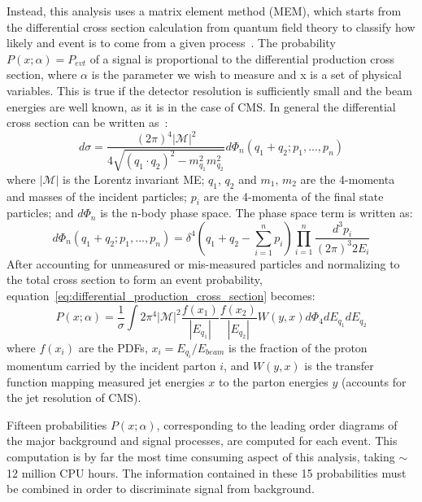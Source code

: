 Instead, this analysis uses a matrix element method (MEM), which starts from the differential cross section calculation from quantum field theory to classify how likely and event is to come from a given process~\cite{Canelli2003,Dong2008}.
The probability $P\left(x;\alpha\right)=P_{evt}$ of a signal is proportional to the differential production cross section, where $\alpha$ is the parameter we wish to measure and x is a set of physical variables.
This is true if the detector resolution is sufficiently small and the beam energies are well known, as it is in the case of CMS.
In general the differential cross section can be written as~\cite{Olive:2016xmw}:
\begin{equation}\label{eq:differential_production_cross_section}
d\sigma=\frac{\left(2\pi\right)^{4}|\mathcal{M}|^{2}}{4\sqrt{\left(q_{1}\cdot{q_{2}}\right)^{2}-m_{q_{1}}^{2}m_{q_{2}}^{2}}}d\Phi_{n}\left(q_{1}+q_{2};p_{1},...,p_{n}\right)
\end{equation}
where $|\mathcal{M}|$ is the Lorentz invariant ME; $q_{1}$, $q_{2}$ and $m_{1}$, $m_{2}$ are the 4-momenta and masses of the incident particles; $p_{i}$ are the 4-momenta of the final state particles; and $d\Phi_{n}$ is the n-body phase space.
The phase space term is written as:
\begin{equation}
d\Phi_{n}\left(q_{1}+q_{2};p_{1},...,p_{n}\right)=\delta^{4}\left(q_{1}+q_{2}-\sum_{i=1}^{n}p_{i}\right)\prod_{i=1}^{n}\frac{d^{3}p_{i}}{\left(2\pi\right)^{3}2E_{i}}
\end{equation}
After accounting for unmeasured or mis-measured particles and normalizing to the total cross section to form an event probability, equation~\ref{eq:differential_production_cross_section} becomes:
\begin{equation}
P(x;\alpha)=\frac{1}{\sigma}\int2\pi^{4}|\mathcal{M}|^{2}\frac{f\left(x_{1}\right)}{|E_{q_{1}}|}\frac{f\left(x_{2}\right)}{|E_{q_{2}}|}W\left(y,x\right)d\Phi_{4}dE_{q_{1}}dE_{q_{2}}
\end{equation}
where $f\left(x_{i}\right)$ are the PDFs, $x_{i}=E_{q_{i}}/E_{beam}$ is the fraction of the proton momentum carried by the incident parton $i$, and $W\left(y,x\right)$ is the transfer function mapping measured jet energies $x$ to the parton energies $y$ (accounts for the jet resolution of CMS).

Fifteen probabilities $P(x;\alpha)$, corresponding to the leading order diagrams of the major background and signal processes, are computed for each event. 
This computation is by far the most time consuming aspect of this analysis, taking $\sim$12 million CPU hours.
The information contained in these 15 probabilities must be combined in order to discriminate signal from background.

